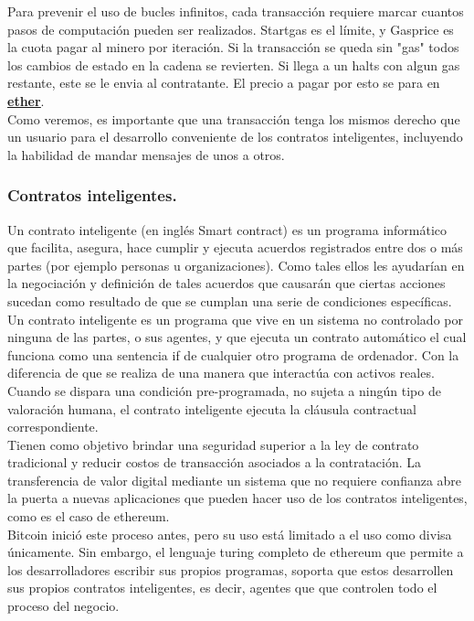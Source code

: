 \documentclass[11pt,a4paper]{article}
\begin{document}
Para prevenir el uso de bucles infinitos, cada transacción requiere marcar cuantos pasos de computación pueden ser realizados. Startgas es el límite, y Gasprice es la cuota pagar al minero por iteración. Si la transacción se queda sin "gas" todos los cambios de estado en la cadena se revierten. Si llega a un halts con algun gas restante, este se le envia al contratante. El precio a pagar por esto se para en \hyperref[sec:ether]{\underline{\textbf{ether}}}.\\

Como veremos, es importante que una transacción tenga los mismos derecho que un usuario para el desarrollo conveniente de los contratos inteligentes, incluyendo la habilidad de mandar mensajes de unos a otros.\\


\subsubsection{Contratos inteligentes.}

Un contrato inteligente (en inglés Smart contract) es un programa informático que facilita, asegura, hace cumplir y ejecuta acuerdos registrados entre dos o más partes (por ejemplo personas u organizaciones). Como tales ellos les ayudarían en la negociación y definición de tales acuerdos que causarán que ciertas acciones sucedan como resultado de que se cumplan una serie de condiciones específicas.\\

Un contrato inteligente es un programa que vive en un sistema no controlado por ninguna de las partes, o sus agentes, y que ejecuta un contrato automático el cual funciona como una sentencia if de cualquier otro programa de ordenador. Con la diferencia de que se realiza de una manera que interactúa con activos reales. Cuando se dispara una condición pre-programada, no sujeta a ningún tipo de valoración humana, el contrato inteligente ejecuta la cláusula contractual correspondiente.\\

Tienen como objetivo brindar una seguridad superior a la ley de contrato tradicional y reducir costos de transacción asociados a la contratación. La transferencia de valor digital mediante un sistema que no requiere confianza abre la puerta a nuevas aplicaciones que pueden hacer uso de los contratos inteligentes, como es el caso de ethereum.\\

Bitcoin inició este proceso antes, pero su uso está limitado a el uso como divisa únicamente. Sin embargo, el lenguaje turing completo de ethereum que permite a los desarrolladores escribir sus propios programas, soporta que estos desarrollen sus propios contratos inteligentes, es decir, agentes que que controlen todo el proceso del negocio.\\
\end{document}
